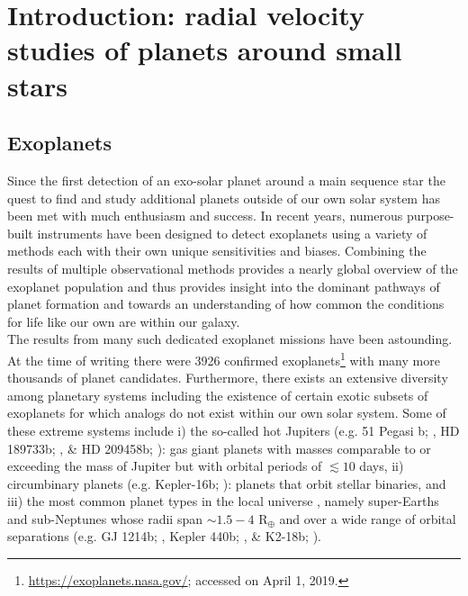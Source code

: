 \chapter[Introduction]{Introduction: radial velocity studies of planets around small stars}

\section{Exoplanets}  \label{sect:exoplanets}
Since the first detection of an exo-solar planet around a main sequence star 
\citep{mayor95}
the quest to find and study additional planets outside of our own solar system 
has been met with much enthusiasm and success. In recent years, numerous 
purpose-built instruments
have been designed to detect exoplanets using a variety of methods each with
their own unique sensitivities and biases. 
Combining the results of multiple observational methods provides a nearly global
overview of the exoplanet population and thus provides insight into
the dominant pathways of planet formation and towards an understanding of how
common the conditions for life like our own are within our galaxy. \\

The results from many such dedicated exoplanet missions have been 
astounding. At the time of writing there were 3926 confirmed 
exoplanets\footnote{\url{https://exoplanets.nasa.gov/}; accessed on April 1, 2019.} 
with many more thousands of planet candidates. Furthermore, there 
exists an extensive diversity among planetary systems including the existence 
of certain exotic subsets of exoplanets for which analogs do not exist within 
our own solar system. Some of these extreme systems include i) the so-called hot 
Jupiters (e.g. 51 Pegasi b; \citealt{mayor95}, HD 189733b; \citealt{bouchy05}, 
\& HD 209458b; \citealt{mazeh99, charbonneau00}): 
gas giant planets with masses comparable to or exceeding the mass of Jupiter  
but with orbital periods of $\lesssim 10$ days, ii) circumbinary planets (e.g. 
Kepler-16b; \citealt{doyle11}): 
planets that orbit stellar binaries, and iii) the most common planet types
in the local universe \citep{petigura13}, namely super-Earths and sub-Neptunes whose
radii span $\sim 1.5-4$ R$_{\oplus}$ and over a wide range of orbital separations
(e.g. GJ 1214b; \citealt{charbonneau09}, Kepler 440b; \citealt{torres15}, \&
K2-18b; \citealt{foremanmackey15a,montet15}).


